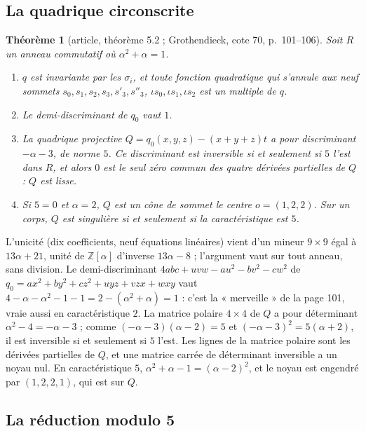 \documentclass[11pt,a4paper]{amsart}
\theoremstyle{definition}
\theoremstyle{plain}
\newtheorem{theoreme}{Théorème}
\theoremstyle{remark}
\newcommand{\Z}{\mathbb Z}
\begin{document}
\subsection{La quadrique circonscrite}

\begin{theoreme}[article, théorème 5.2 ; Grothendieck, cote 70, p.~101--106]
Soit $R$ un anneau commutatif où $\alpha^2 + \alpha = 1$.
\begin{enumerate}
\item $q$ est invariante par les $\sigma_i$, et toute fonction quadratique qui s'annule aux neuf sommets $s_0, s_1, s_2, s_3, s'_3, s''_3$, $\iota s_0, \iota s_1, \iota s_2$ est un multiple de $q$.
\item Le demi-discriminant de $q_0$ vaut $1$.
\item La quadrique projective $Q = q_0(x,y,z) - (x+y+z)t$ a pour discriminant $-\alpha - 3$, de norme $5$. Ce discriminant est inversible si et seulement si $5$ l'est dans $R$, et alors $0$ est le seul zéro commun des quatre dérivées partielles de $Q$ : $Q$ est lisse.
\item Si $5 = 0$ et $\alpha = 2$, $Q$ est un cône de sommet le centre $o = (1, 2, 2)$. Sur un corps, $Q$ est singulière si et seulement si la caractéristique est $5$.
\end{enumerate}
\end{theoreme}

L'unicité (dix coefficients, neuf équations linéaires) vient d'un mineur $9 \times 9$ égal à $13\alpha + 21$, unité de $\Z[\alpha]$ d'inverse $13\alpha - 8$ ; l'argument vaut sur tout anneau, sans division. Le demi-discriminant $4abc + uvw - au^2 - bv^2 - cw^2$ de $q_0 = ax^2 + by^2 + cz^2 + uyz + vzx + wxy$ vaut $4 - \alpha - \alpha^2 - 1 - 1 = 2 - (\alpha^2 + \alpha) = 1$ : c'est la « merveille » de la page 101, vraie aussi en caractéristique $2$. La matrice polaire $4 \times 4$ de $Q$ a pour déterminant $\alpha^2 - 4 = -\alpha - 3$ ; comme $(-\alpha - 3)(\alpha - 2) = 5$ et $(-\alpha - 3)^2 = 5(\alpha + 2)$, il est inversible si et seulement si $5$ l'est. Les lignes de la matrice polaire sont les dérivées partielles de $Q$, et une matrice carrée de déterminant inversible a un noyau nul. En caractéristique $5$, $\alpha^2 + \alpha - 1 = (\alpha - 2)^2$, et le noyau est engendré par $(1, 2, 2, 1)$, qui est sur $Q$.

\subsection{La réduction modulo 5}
\end{document}
